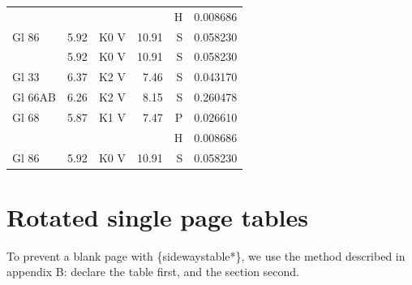 \documentclass{aa}
\begin{document}
\begin{appendix}
\begin{longtable}{lllrrr}
		          &         &          &          & H    & 0.008686   \\
		Gl 86     & 5.92    & K0 V     & 10.91    & S    & 0.058230   \\            & 5.92 & K0 V & 10.91& S & 0.058230\\
		Gl 33     & 6.37    & K2 V     & 7.46     & S    & 0.043170   \\
		Gl 66AB   & 6.26    & K2 V     & 8.15     & S    & 0.260478   \\
		Gl 68     & 5.87    & K1 V     & 7.47     & P    & 0.026610   \\
		          &         &          &          & H    & 0.008686   \\
		Gl 86     & 5.92    & K0 V     & 10.91    & S    & 0.058230   \\
	\end{longtable}


	\FloatBarrier %
	\twocolumn
	\begin{table}
		\section{Rotated single page tables}
		To prevent a blank page with \{sidewaystable*\}, we use the method
		described in appendix B: declare the table first, and the section second.


\end{table}
\end{appendix}
\end{document}
